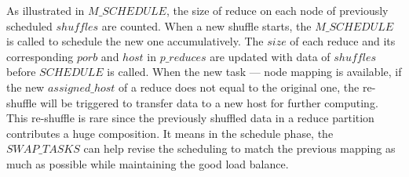As illustrated in $M\_SCHEDULE$, the size of reduce on each node of previously scheduled $shuffles$ are counted. When a new shuffle starts, the $M\_SCHEDULE$ is called to schedule the new one accumulatively. The $size$ of each reduce and its corresponding $porb$ and $host$ in $p\_reduces$ are updated with data of $shuffles$ before $SCHEDULE$ is called. When the new task --- node mapping is available, if the new $assigned\_host$ of a reduce does not equal to the original one, the re-shuffle will be triggered to transfer data to a new host for further computing. This re-shuffle is rare since the previously shuffled data in a reduce partition contributes a huge composition. It means in the schedule phase, the $SWAP\_TASKS$ can help revise the scheduling to match the previous mapping as much as possible while maintaining the good load balance.

